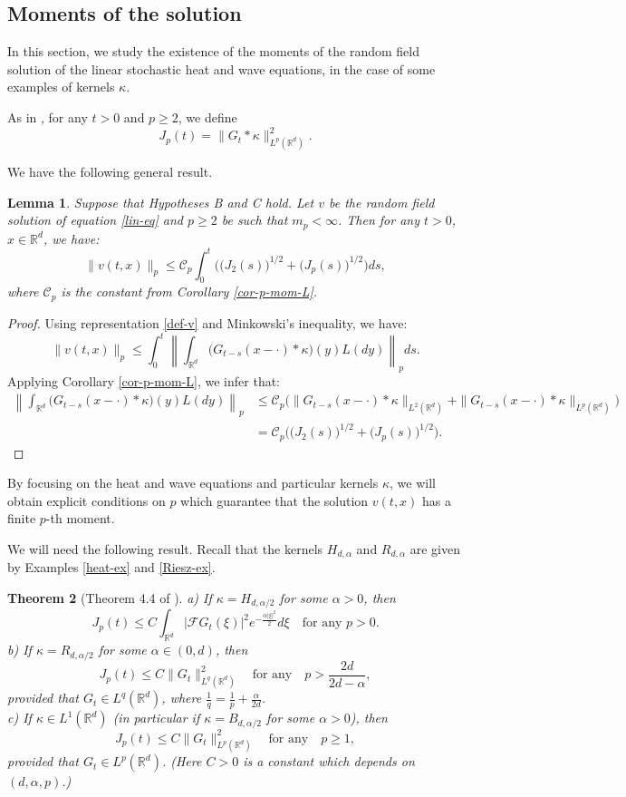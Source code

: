 \documentclass[12pt]{article}
\newtheorem{theorem}{Theorem}[section]
\newtheorem{lemma}[theorem]{Lemma}
\def\cC{\mathcal{C}}
\def\cF{\mathcal{F}}
\def\bR{\mathbb{R}}
\def\k{\kappa}
\begin{document}
\subsection{Moments of the solution}

In this section, we study the existence of the moments of the random field solution of the linear stochastic heat and wave equations, in the case of some examples of kernels $\k$.

\medskip

As in \cite{BJ26}, for any $t>0$ and $p\geq 2$, we define
\[
J_p(t)=\|G_t*\k\|_{L^p(\bR^d)}^2.
\]

We have the following general result.

\begin{lemma}
\label{mom-v-lem}
Suppose that Hypotheses B and C hold. Let $v$ be the random field solution of equation \eqref{lin-eq} and $p\geq 2$ be such that $m_p<\infty$. Then for any $t>0$, $x \in \bR^d$, we have:
\[
\|v(t,x)\|_p \leq \cC_p \int_0^t \Big(\big(J_2(s) \big)^{1/2}+ \big(J_p(s) \big)^{1/2}\Big)ds,
\]
where $\cC_p$ is the constant from Corollary \ref{cor-p-mom-L}.
\end{lemma}

\begin{proof}
Using representation \eqref{def-v} and Minkowski's inequality, we have: 
\[
\|v(t,x)\|_p \leq \int_0^t \left\| \int_{\bR^d} \big(G_{t-s}(x-\cdot)*\k \big)(y) L(dy)\right\|_p ds.
\]
Applying Corollary \ref{cor-p-mom-L}, we infer that:
\begin{align*}
\left\| \int_{\bR^d} \big(G_{t-s}(x-\cdot)*\k \big)(y) L(dy)\right\|_p & \leq \cC_p  \Big( \|G_{t-s}(x-\cdot)*\k\|_{L^2(\bR^d)}+ \|G_{t-s}(x-\cdot)*\k\|_{L^p(\bR^d)} \Big)\\
&=\cC_p \Big( \big(J_2(s) \big)^{1/2}+ \big(J_p(s) \big)^{1/2} \Big).
\end{align*}
\end{proof}


By focusing on the heat and wave equations and particular kernels $\k$, we will obtain explicit conditions on $p$ which guarantee that the solution $v(t,x)$ has a finite $p$-th moment. 

\medskip

We will need the following result. Recall that the kernels $H_{d,\alpha}$ and $R_{d,\alpha}$ are given by Examples \ref{heat-ex} and \ref{Riesz-ex}.

\begin{theorem}[Theorem 4.4 of \cite{BJ26}]
\label{th44}
a) If $\k =H_{d,\alpha/2}$ for some $\alpha>0$, then
\[
J_p(t) \leq C \int_{\bR^d}|\cF G_t(\xi)|^2 e^{-\frac{\alpha|\xi|^2}{2}}d\xi \quad \mbox{for any $p>0$}.
\]
b) If $\k=R_{d,\alpha/2}$ for some $\alpha \in (0,d)$, then
\[
J_p(t) \leq C \|G_t\|_{L^q(\bR^d)}^2 \quad \mbox{for any} \quad p>\frac{2d}{2d-\alpha},
\]
provided that $G_t \in L^q(\bR^d)$, where $\frac{1}{q}=\frac{1}{p}+\frac{\alpha}{2d}$.\\
c) If $\k \in L^1(\bR^d)$ (in particular if $\k=B_{d,\alpha/2}$ for some $\alpha>0$), then
\[
J_p(t) \leq C \|G_t\|_{L^p(\bR^d)}^2 \quad \mbox{for any}  \quad p\geq 1,
\]
provided that $G_t \in L^p(\bR^d)$. (Here $C>0$ is a constant which depends on $(d,\alpha,p)$.)
\end{theorem}  
\end{document}
